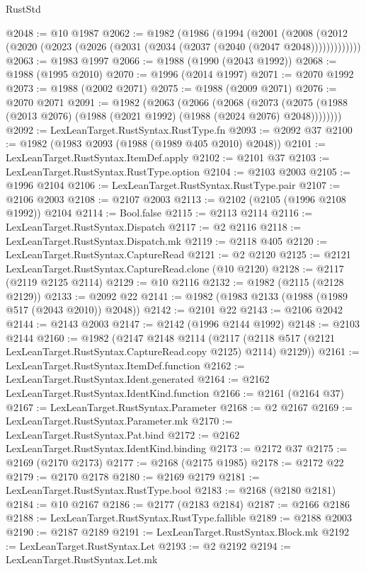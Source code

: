 \begin{lexlean}{RustStd}
\begin{coremodule}
@2048 := @10 @1987
@2062 := @1982
    (@1986
      (@1994
        (@2001
          (@2008 (@2012 (@2020 (@2023 (@2026 (@2031 (@2034 (@2037 (@2040 (@2047 @2048)))))))))))))
@2063 := @1983 @1997
@2066 := @1988 (@1990 (@2043 @1992))
@2068 := @1988 (@1995 @2010)
@2070 := @1996 (@2014 @1997)
@2071 := @2070 @1992
@2073 := @1988 (@2002 @2071)
@2075 := @1988 (@2009 @2071)
@2076 := @2070 @2071
@2091 := @1982
    (@2063
      (@2066
        (@2068
          (@2073 (@2075 (@1988 (@2013 @2076) (@1988 (@2021 @1992) (@1988 (@2024 @2076) @2048))))))))
@2092 := LexLeanTarget.RustSyntax.RustType.fn
@2093 := @2092 @37
@2100 := @1982 (@1983 @2093 (@1988 (@1989 @405 @2010) @2048))
@2101 := LexLeanTarget.RustSyntax.ItemDef.apply
@2102 := @2101 @37
@2103 := LexLeanTarget.RustSyntax.RustType.option
@2104 := @2103 @2003
@2105 := @1996 @2104
@2106 := LexLeanTarget.RustSyntax.RustType.pair
@2107 := @2106 @2003
@2108 := @2107 @2003
@2113 := @2102 (@2105 (@1996 @2108 @1992)) @2104
@2114 := Bool.false
@2115 := @2113 @2114
@2116 := LexLeanTarget.RustSyntax.Dispatch
@2117 := @2 @2116
@2118 := LexLeanTarget.RustSyntax.Dispatch.mk
@2119 := @2118 @405
@2120 := LexLeanTarget.RustSyntax.CaptureRead
@2121 := @2 @2120
@2125 := @2121 LexLeanTarget.RustSyntax.CaptureRead.clone (@10 @2120)
@2128 := @2117 (@2119 @2125 @2114)
@2129 := @10 @2116
@2132 := @1982 (@2115 (@2128 @2129))
@2133 := @2092 @22
@2141 := @1982 (@1983 @2133 (@1988 (@1989 @517 (@2043 @2010)) @2048))
@2142 := @2101 @22
@2143 := @2106 @2042
@2144 := @2143 @2003
@2147 := @2142 (@1996 @2144 @1992)
@2148 := @2103 @2144
@2160 := @1982
    (@2147
      @2148
      @2114
      (@2117 (@2118 @517 (@2121 LexLeanTarget.RustSyntax.CaptureRead.copy @2125) @2114) @2129))
@2161 := LexLeanTarget.RustSyntax.ItemDef.function
@2162 := LexLeanTarget.RustSyntax.Ident.generated
@2164 := @2162 LexLeanTarget.RustSyntax.IdentKind.function
@2166 := @2161 (@2164 @37)
@2167 := LexLeanTarget.RustSyntax.Parameter
@2168 := @2 @2167
@2169 := LexLeanTarget.RustSyntax.Parameter.mk
@2170 := LexLeanTarget.RustSyntax.Pat.bind
@2172 := @2162 LexLeanTarget.RustSyntax.IdentKind.binding
@2173 := @2172 @37
@2175 := @2169 (@2170 @2173)
@2177 := @2168 (@2175 @1985)
@2178 := @2172 @22
@2179 := @2170 @2178
@2180 := @2169 @2179
@2181 := LexLeanTarget.RustSyntax.RustType.bool
@2183 := @2168 (@2180 @2181)
@2184 := @10 @2167
@2186 := @2177 (@2183 @2184)
@2187 := @2166 @2186
@2188 := LexLeanTarget.RustSyntax.RustType.fallible
@2189 := @2188 @2003
@2190 := @2187 @2189
@2191 := LexLeanTarget.RustSyntax.Block.mk
@2192 := LexLeanTarget.RustSyntax.Let
@2193 := @2 @2192
@2194 := LexLeanTarget.RustSyntax.Let.mk

\end{coremodule}
\end{lexlean}
